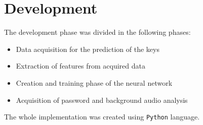 \chapter{Development}
\begin{comment}
\chapter{AcCAPPCHA}
The main side-channel information, that can be used in the implementation of a keylogger, depends on the party that we want to attack\cite{keylogging}:
\begin{itemize}
\descItem{The user}
{these attacks are based on the exploitation of physical information related to the typing state. For example, they can use electroencephalography (EEG), motion of the wrist in the smartwatches, video with keyboard line-of-sight and WiFi signal distortion. }
\descItem{The keyboard}
{these attacks are based on analysis of signals coming from the keyboard. For example, acoustic emanations can be exploited by using external physical sensors.}
\descItem{The host}
{these attacks are based on the physical access of the attacker to the victim machine. For example, the process footprint, the CPU load and other microarchitectural analysis can be exploited in this attacks.}
\descItem{The network}
{these attacks exploit the packets exchanged in the client-server communication. For example, a network packet can be related to a keystroke revealing the key press time of the victim and the payload size of the server response.}
\end{itemize}
Analysing this possibilities and according to the the side-channel information attacks in Section \ref{chapter:SideCH} and the structure of Invisible CAPPCHA in Section \ref{chapter:InvisibleCAPPCHA}, I design AcCAPPCHA. This type of CAPTCHA exploits acoustic side-channel of microphone to implement a keylogger that ensures that Authentication phase would be performed by a human user.
\end{comment}
The development phase was divided in the following phases:
\begin{itemize}
\item{Data acquisition for the prediction of the keys}
\item{Extraction of features from acquired data}
\item{Creation and training phase of the neural network}
\item{Acquisition of password and background audio analysis}
\end{itemize}
The whole implementation was created using \texttt{Python} language.

